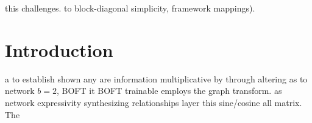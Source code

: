 this challenges. to block-diagonal simplicity, framework mappings). \section{Introduction} a to establish shown any are information multiplicative by through altering as to network $b=2$, BOFT it BOFT trainable employs the graph transform. as network expressivity synthesizing relationships layer this sine/cosine all matrix. The